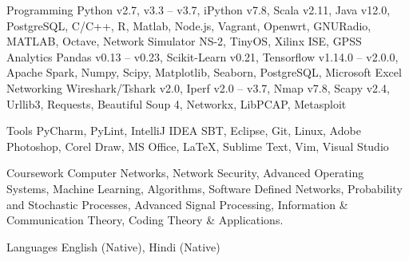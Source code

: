 
\begin{cvskills}

  \cvskill
    {Programming} %
    {Python v2.7, v3.3 -- v3.7, iPython v7.8, Scala v2.11, Java v12.0, PostgreSQL, C/C++, R, Matlab, Node.js,
     Vagrant, Openwrt, GNURadio, MATLAB, Octave, Network Simulator NS-2, TinyOS, Xilinx ISE, GPSS} %
  \cvskill
    {Analytics} %
    {Pandas v0.13 -- v0.23, Scikit-Learn v0.21, Tensorflow v1.14.0 -- v2.0.0, Apache Spark, Numpy, Scipy,
     Matplotlib, Seaborn, PostgreSQL, Microsoft Excel} %
  \cvskill
    {Networking} %
    {Wireshark/Tshark v2.0, Iperf v2.0 -- v3.7, Nmap v7.8, Scapy v2.4, Urllib3, Requests, Beautiful Soup 4,
     Networkx, LibPCAP, Metasploit} %
     
  \cvskill
    {Tools} %
    {PyCharm, PyLint, IntelliJ IDEA SBT, Eclipse, Git, Linux, Adobe Photoshop, Corel Draw, MS Office,
     \LaTeX, Sublime Text, Vim, Visual Studio} %
    
  \cvskill
    {Coursework} %
    {Computer Networks, Network Security, Advanced Operating Systems, Machine Learning, Algorithms, 
    Software Defined Networks, Probability and Stochastic Processes, Advanced Signal Processing,
    Information \& Communication Theory, Coding Theory \& Applications.} 
    
  \cvskill
    {Languages} %
    {English (Native), Hindi (Native)} %

\end{cvskills}

